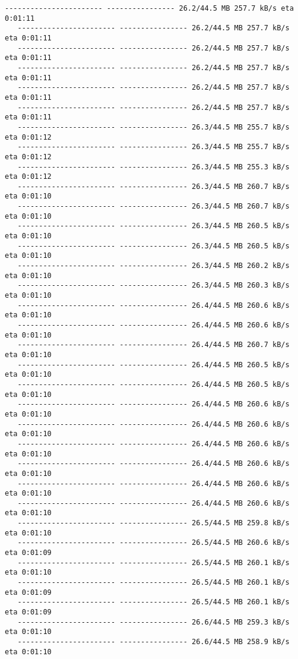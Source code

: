 \documentclass[11pt]{article}
\begin{document}
\begin{Verbatim}[commandchars=\\\{\}]
   ----------------------- ---------------- 26.2/44.5 MB 257.7 kB/s eta 0:01:11
   ----------------------- ---------------- 26.2/44.5 MB 257.7 kB/s eta 0:01:11
   ----------------------- ---------------- 26.2/44.5 MB 257.7 kB/s eta 0:01:11
   ----------------------- ---------------- 26.2/44.5 MB 257.7 kB/s eta 0:01:11
   ----------------------- ---------------- 26.2/44.5 MB 257.7 kB/s eta 0:01:11
   ----------------------- ---------------- 26.2/44.5 MB 257.7 kB/s eta 0:01:11
   ----------------------- ---------------- 26.3/44.5 MB 255.7 kB/s eta 0:01:12
   ----------------------- ---------------- 26.3/44.5 MB 255.7 kB/s eta 0:01:12
   ----------------------- ---------------- 26.3/44.5 MB 255.3 kB/s eta 0:01:12
   ----------------------- ---------------- 26.3/44.5 MB 260.7 kB/s eta 0:01:10
   ----------------------- ---------------- 26.3/44.5 MB 260.7 kB/s eta 0:01:10
   ----------------------- ---------------- 26.3/44.5 MB 260.5 kB/s eta 0:01:10
   ----------------------- ---------------- 26.3/44.5 MB 260.5 kB/s eta 0:01:10
   ----------------------- ---------------- 26.3/44.5 MB 260.2 kB/s eta 0:01:10
   ----------------------- ---------------- 26.3/44.5 MB 260.3 kB/s eta 0:01:10
   ----------------------- ---------------- 26.4/44.5 MB 260.6 kB/s eta 0:01:10
   ----------------------- ---------------- 26.4/44.5 MB 260.6 kB/s eta 0:01:10
   ----------------------- ---------------- 26.4/44.5 MB 260.7 kB/s eta 0:01:10
   ----------------------- ---------------- 26.4/44.5 MB 260.5 kB/s eta 0:01:10
   ----------------------- ---------------- 26.4/44.5 MB 260.5 kB/s eta 0:01:10
   ----------------------- ---------------- 26.4/44.5 MB 260.6 kB/s eta 0:01:10
   ----------------------- ---------------- 26.4/44.5 MB 260.6 kB/s eta 0:01:10
   ----------------------- ---------------- 26.4/44.5 MB 260.6 kB/s eta 0:01:10
   ----------------------- ---------------- 26.4/44.5 MB 260.6 kB/s eta 0:01:10
   ----------------------- ---------------- 26.4/44.5 MB 260.6 kB/s eta 0:01:10
   ----------------------- ---------------- 26.4/44.5 MB 260.6 kB/s eta 0:01:10
   ----------------------- ---------------- 26.5/44.5 MB 259.8 kB/s eta 0:01:10
   ----------------------- ---------------- 26.5/44.5 MB 260.6 kB/s eta 0:01:09
   ----------------------- ---------------- 26.5/44.5 MB 260.1 kB/s eta 0:01:10
   ----------------------- ---------------- 26.5/44.5 MB 260.1 kB/s eta 0:01:09
   ----------------------- ---------------- 26.5/44.5 MB 260.1 kB/s eta 0:01:09
   ----------------------- ---------------- 26.6/44.5 MB 259.3 kB/s eta 0:01:10
   ----------------------- ---------------- 26.6/44.5 MB 258.9 kB/s eta 0:01:10

\end{Verbatim}
\end{document}
